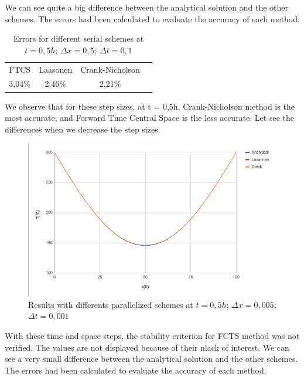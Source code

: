 \documentclass{article}
\begin{document}
                We can see quite a big difference between the analytical solution and the other schemes. The errors had been calculated 
                to evaluate the accuracy of each method.

                \begin{table}[H]
                    \centering
                    \caption{Errors for different serial schemes at $t = 0,5h$; $\Delta x=0,5$; $\Delta t=0,1$}
                    \begin{tabular}{|c|c|c|l}
                    \cline{1-3}
                    FTCS     & Laasonen & Crank-Nicholson &  \\ \cline{1-3}
                    3,04\%   & 2,46\%   & 2,21\%          &  \\ \cline{1-3}
                    \end{tabular}
                    
                \end{table}

                We observe that for these step sizes, at t = 0,5h, Crank-Nicholson method is the 
                most accurate, and Forward Time Central Space is the less accurate. Let see the 
                differences when we decrease the step sizes.

                \begin{figure}[H]
                    \includegraphics[width=\textwidth]{step_size_2.png}
                    \caption{Results with differents parallelized schemes at $t = 0,5h$; $\Delta x=0,005$; $\Delta t=0,001$}
                \end{figure}

                With these time and space steps, the stability criterion for FCTS method was not 
                verified. The values are not displayed because of their nlack of interest.
                We can see a very small difference between the analytical solution and the other schemes. The errors had been calculated 
                to evaluate the accuracy of each method.
\end{document}
